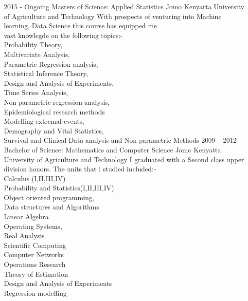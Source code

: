 \documentclass[9pt]{developercv} %
\begin{document}


\begin{entrylist}
	\entry
		{2015 - Ongoing}
		{Masters of Science: Applied Statistics	}
		{Jomo Kenyatta University of Agriculture and Technology	}
{		With prospects of venturing into Machine learning, Data Science this course has equipped me \\
	     vast knowlegde on the following topics:- \\Probability Theory,\\ Multivariate Analysis,\\ Parametric Regression analysis,\\
     Statistical Inference Theory,\\ Design and Analysis of Experiments,\\ Time Series Analysis,\\ Non parametric regression analysis,\\ Epidemiological research methods\\
 Modelling extremal events,\\ Demography and Vital Statistics,\\ Survival and Clinical Data analysis and Non-parametric Methods}
	\entry
		{2009 -- 2012}
		{Bachelor of Science: Mathematics and Computer Science}
		{Jomo Kenyatta University of Agriculture and Technology	}
		{I  graduated with a Second class upper division honors. The units that i studied included:-\\ Calculus (I,II,III,IV)\\ Probability and Statistics(I,II,III,IV)\\Object oriented programming,\\
		Data structures and Algorithms\\ Linear Algebra\\ Operating Systems, \\ Real Analysis \\Scientific Computing \\ Computer Networks \\ Operations Research \\ Theory of Estimation\\ Design and Analysis of Experiments\\Regression modelling\\\\\\\\\\\\\\\\\\\\\\\\\\}
\end{entrylist}
\end{document}
